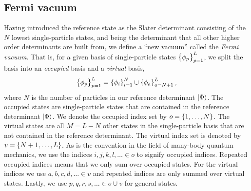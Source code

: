         \subsection{Fermi vacuum}
            \label{subsec:fermi-vacuum}
            Having introduced the reference state as the Slater determinant
            consisting of the $N$ lowest single-particle states, and being the
            determinant that all other higher order determinants are built from,
            we define a ``new vacuum'' called the \emph{Fermi vacuum}.
            That is, for a given basis of single-particle states
            $\left\{ \phi_{p} \right\}_{p = 1}^{L}$, we split the basis into an
            \emph{occupied} basis and a \emph{virtual} basis,
            \begin{align}
                \left\{ \phi_{p} \right\}_{p = 1}^{L}
                = \left\{ \phi_{i} \right\}_{i = 1}^{N}
                \cup
                \left\{ \phi_{a} \right\}_{a = N + 1}^{L},
            \end{align}
            where $N$ is the number of particles in our reference determinant
            $\ket{\Phi}$.
            The occupied states are single-particle states that are contained in
            the reference determinant $\ket{\Phi}$.
            We denote the occupied index set by $o = \left\{ 1, \dots, N \right\}$.
            The virtual states are all $M = L - N$ other states in the
            single-particle basis that are not contained in the reference
            determinant.
            The virtual index set is denoted by $v = \left\{ N + 1, \dots, L \right\}$.
            As is the convention in the field of many-body quantum mechanics, we
            use the indices $i, j, k, l, \dots \in o$ to signify occupied
            indices.
            Repeated occupied indices means that we only sum over occupied
            states.
            For the virtual indices we use $a, b, c, d, \dots \in v$ and
            repeated indices are only summed over virtual states.
            Lastly, we use $p, q, r, s, \dots \in o \cup v$ for general states.

